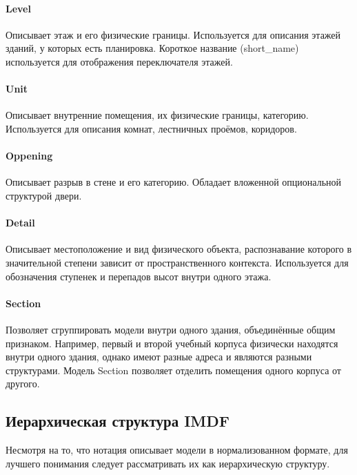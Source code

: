         \paragraph{Level}
          Описывает этаж и его физические границы. Используется для описания этажей зданий, у которых есть планировка. Короткое название (short\_name) используется для отображения переключателя этажей.

        \paragraph{Unit}
          Описывает внутренние помещения, их физические границы, категорию. Используется для описания комнат, лестничных проёмов, коридоров.

        \paragraph{Oppening}
          Описывает разрыв в стене и его категорию. Обладает вложенной опциональной структурой двери.

        \paragraph{Detail}
          Описывает местоположение и вид физического объекта, распознавание которого в значительной степени зависит от пространственного контекста. Используется для обозначения ступенек и перепадов высот внутри одного этажа.

        \paragraph{Section}
          Позволяет сгруппировать модели внутри одного здания, объединённые общим признаком. Например, первый и второй учебный корпуса физически находятся внутри одного здания, однако имеют разные адреса и являются разными структурами. Модель Section позволяет отделить помещения одного корпуса от другого.

    \subsection{Иерархическая структура IMDF}
      Несмотря на то, что нотация описывает модели в нормализованном формате, для лучшего понимания следует рассматривать их как иерархическую структуру.


